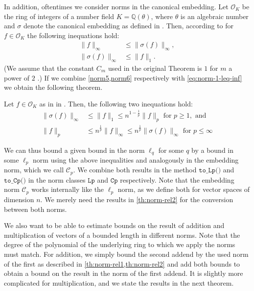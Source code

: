 In addition, oftentimes we consider norms in the canonical embedding. Let $\mathcal{O}_K$ be the ring of integers of a number field $K=\mathbb{Q}(\theta)$, where $\theta$ is an algebraic number and $\sigma$ denote the canonical embedding as defined in \cite{DPSZ12}. Then, according to \cite[Theorem~7]{DPSZ12} for $f \in \mathcal{O}_K$  the following inequations hold: %
\begin{align}
    \| f \|_\infty         & \leq \| \sigma(f) \|_\infty \label{norm5}, \\
    \| \sigma(f) \|_\infty & \leq \| f \|_1 \label{norm6}.
\end{align}
(We assume that the constant $C_m$ used in the original Theorem is $1$ for $m$ a power of $2$ \cite[Lemma~3]{DPSZ12}.) If we combine \cref{norm5,norm6} respectively with \cref{eq:norm-1-leq-inf} we obtain the following theorem.
\begin{theorem}\label{th:norm-rel2}
    Let $f \in \mathcal{O}_K$ as in in \cite{DPSZ12}. Then, the following two inequations hold:
    \begin{align}
        \| \sigma(f) \|_\infty & \leq \| f \|_1 \leq n^{1 - \frac{1}{p}} \| f \|_p \text{ for } p \geq 1, \text{ and } \label{eq:Coo-norm}                  \\
        \| f \|_p              & \leq  n^{\frac{1}{p}} \| f \|_\infty \leq n^{\frac{1}{p}} \| \sigma(f) \|_\infty \text{ for } p \leq \infty  \label{norm7}
    \end{align}
\end{theorem}
We can thus bound a given bound in the norm $\ell_q$ for some $q$ by a bound in some $\ell_p$ norm using the above inequalities and analogously in the embedding norm, which we call $\mathcal{C}_p$. We combine both results in the method $\texttt{to\_Lp()}$ and $\texttt{to\_Cp()}$ in the norm classes $\texttt{Lp}$ and $\texttt{Cp}$ respectively. Note that the embedding norm $\mathcal{C}_p$ works internally like the $\ell_p$ norm, as we define both for vector spaces of dimension $n$. We merely need the results in \cref{th:norm-rel2} for the conversion between both norms.

We also want to be able to estimate bounds on the result of addition and multiplication of vectors of a bounded length in different norms. Note that the degree of the polynomial of the underlying ring to which we apply the norms must match. For addition, we simply bound the second addend by the used norm of the first as described in \cref{th:norm-rel1,th:norm-rel2} and add both bounds to obtain a bound on the result in the norm of the first addend. It is slightly more complicated for multiplication, and we state the results in the next theorem.

